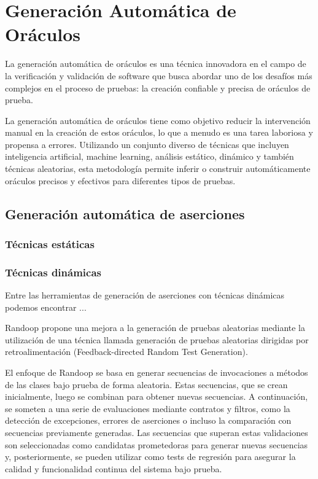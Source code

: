 \chapter{Generación Automática de Oráculos}

La generación automática de oráculos es una técnica innovadora en el campo de la verificación y validación de software que busca abordar uno de los desafíos más complejos en el proceso de pruebas: la creación confiable y precisa de oráculos de prueba.


La generación automática de oráculos tiene como objetivo reducir la intervención manual en la creación de estos oráculos, lo que a menudo es una tarea laboriosa y propensa a errores. Utilizando un conjunto diverso de técnicas que incluyen inteligencia artificial, machine learning, análisis estático, dinámico y también técnicas aleatorias, esta metodología permite inferir o construir automáticamente oráculos precisos y efectivos para diferentes tipos de pruebas.

\section{Generación automática de aserciones}

\subsection{Técnicas estáticas}


\subsection{Técnicas dinámicas}

Entre las herramientas de generación de aserciones con técnicas dinámicas podemos encontrar ... 

Randoop propone una mejora a la generación de pruebas aleatorias mediante la utilización de una técnica llamada generación de pruebas aleatorias dirigidas por retroalimentación (Feedback-directed Random Test Generation).

El enfoque de Randoop se basa en generar secuencias de invocaciones a métodos de las clases bajo prueba de forma aleatoria. Estas secuencias, que se crean inicialmente, luego se combinan para obtener nuevas secuencias. A continuación, se someten a una serie de evaluaciones mediante contratos y filtros, como la detección de excepciones, errores de aserciones o incluso la comparación con secuencias previamente generadas. Las secuencias que superan estas validaciones son seleccionadas como candidatas prometedoras para generar nuevas secuencias y, posteriormente, se pueden utilizar como tests de regresión para asegurar la calidad y funcionalidad continua del sistema bajo prueba.

